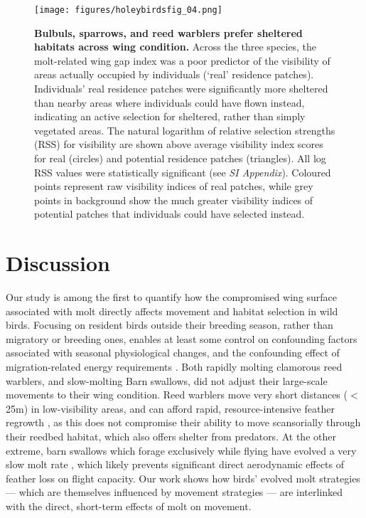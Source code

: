 \begin{refsection}
\begin{figure}%
\centering
\texttt{[image: figures/holeybirdsfig\_04.png]}
\caption{
    \textbf{Bulbuls, sparrows, and reed warblers prefer sheltered habitats across wing condition.}
    Across the three species, the molt-related wing gap index was a poor predictor of the visibility of areas actually occupied by individuals (`real' residence patches).
    Individuals' real residence patches were significantly more sheltered than nearby areas where individuals could have flown instead, indicating an active selection for sheltered, rather than simply vegetated areas.
    The natural logarithm of relative selection strengths (RSS) for visibility are shown above average visibility index scores for real (circles) and potential residence patches (triangles).
    All log RSS values were statistically significant (see \textit{SI Appendix}).
    Coloured points represent raw visibility indices of real patches, while grey points in background show the much greater visibility indices of potential patches that individuals could have selected instead.
}\label{fig_holey_04}
\end{figure}

\section*{Discussion}

Our study is among the first to quantify how the compromised wing surface associated with molt directly affects movement and habitat selection in wild birds.
Focusing on resident birds outside their breeding season, rather than migratory or breeding ones, enables at least some control on confounding factors associated with seasonal physiological changes, and the confounding effect of migration-related energy requirements \cite{alerstam1990,wikelski2003,horvitz2014}.
Both rapidly molting clamorous reed warblers, and slow-molting Barn swallows, did not adjust their large-scale movements to their wing condition.
Reed warblers move very short distances ($<$ 25m) in low-visibility areas, and can afford rapid, resource-intensive feather regrowth \citep{lindstrom1993,newton2009,kiat2017}, as this does not compromise their ability to move scansorially through their reedbed habitat, which also offers shelter from predators.
At the other extreme, barn swallows which forage exclusively while flying have evolved a very slow molt rate \cite{kiat2016}, which likely prevents significant direct aerodynamic effects of feather loss on flight capacity.
Our work shows how birds' evolved molt strategies --- which are themselves influenced by movement strategies \cite{kiat2016} --- are interlinked with the direct, short-term effects of molt on movement.


\end{refsection}
